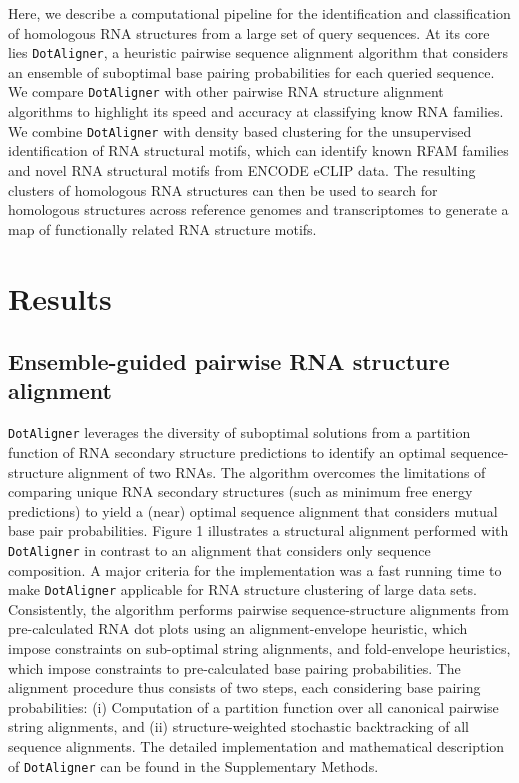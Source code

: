 \documentclass{bmcart}
\newcommand\dotaligner{\texttt{DotAligner}}
\begin{document}
Here, we describe a computational pipeline for the identification and classification of
homologous RNA structures from a large set of query sequences. At its core lies \dotaligner{}, a
heuristic pairwise sequence alignment algorithm that considers an ensemble of suboptimal 
base pairing probabilities for each queried sequence. We compare \dotaligner{} with other pairwise RNA structure alignment algorithms to highlight its speed and accuracy at classifying know RNA families. 
We combine \dotaligner{} with density based clustering for the unsupervised identification of 
RNA structural motifs, which can identify known RFAM families and novel RNA structural 
motifs from ENCODE eCLIP data. The resulting clusters of homologous RNA structures can then 
be used to search for homologous structures across reference genomes and transcriptomes 
to generate a map of functionally related RNA structure motifs.  


\section*{Results}
\subsection*{Ensemble-guided pairwise RNA structure alignment} 
 
\dotaligner{} leverages the diversity of  suboptimal solutions from a partition function of RNA secondary structure predictions to identify an optimal sequence-structure alignment of two RNAs. 
The algorithm overcomes the limitations of comparing unique RNA 
secondary structures (such as minimum free energy predictions) to yield 
a (near) optimal sequence alignment that considers mutual base pair probabilities.
Figure 1 illustrates a structural alignment performed with \dotaligner{}
in contrast to an alignment that considers only sequence composition.
A major criteria for the implementation was a fast running time to make 
\dotaligner{}  applicable for RNA structure clustering of large data sets.
Consistently, the algorithm performs pairwise sequence-structure alignments from 
pre-calculated RNA dot plots using an alignment-envelope heuristic, which 
impose constraints on sub-optimal string alignments, and fold-envelope 
heuristics, which impose constraints to pre-calculated base pairing probabilities.
The alignment procedure thus consists of two steps, each considering base pairing  
probabilities: (i) Computation of a partition function over all canonical pairwise 
string alignments, and (ii) structure-weighted stochastic backtracking of 
all sequence alignments. The detailed implementation and mathematical description 
of \dotaligner{} can be found  in the Supplementary Methods.\\
\end{document}
